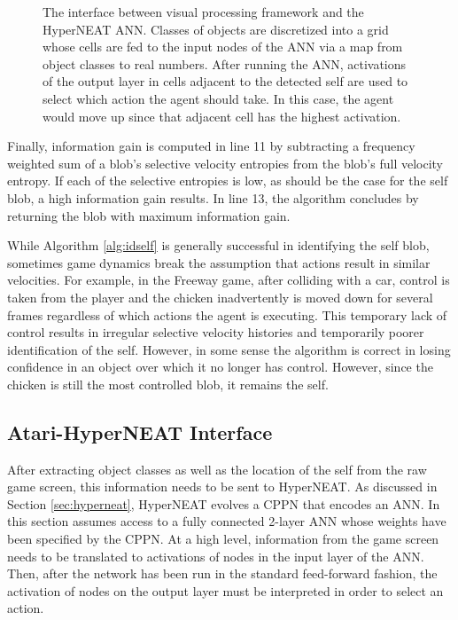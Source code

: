 \documentclass{acm_proc_article-sp}
\begin{document}
\begin{figure}
 \caption{The interface between visual processing framework and the HyperNEAT ANN. Classes of objects are discretized into a grid whose cells are fed to the input nodes of the ANN via a map from object classes to real numbers. After running the ANN, activations of the output layer in cells adjacent to the detected self are used to select which action the agent should take. In this case, the agent would move up since that adjacent cell has the highest activation.}
 \label{fig:interface}
\end{figure}

Finally, information gain is computed in line 11 by subtracting a frequency weighted sum of a blob's selective velocity entropies from the blob's full velocity entropy. If each of the selective entropies is low, as should be the case for the self blob, a high information gain results. In line 13, the algorithm concludes by returning the blob with maximum information gain.

While Algorithm \ref{alg:idself} is generally successful in identifying the self blob, sometimes game dynamics break the assumption that actions result in similar velocities. For example, in the Freeway game, after colliding with a car, control is taken from the player and the chicken inadvertently is moved down for several frames regardless of which actions the agent is executing. This temporary lack of control results in irregular selective velocity histories and temporarily poorer identification of the self. However, in some sense the algorithm is correct in losing confidence in an object over which it no longer has control. However, since the chicken is still the most controlled blob, it remains the self.

\subsection{Atari-HyperNEAT Interface}
\label{sec:interface}
After extracting object classes as well as the location of the self from the raw game screen, this information needs to be sent to HyperNEAT. As discussed in Section \ref{sec:hyperneat}, HyperNEAT evolves a CPPN that encodes an ANN. In this section assumes access to a fully connected 2-layer ANN whose weights have been specified by the CPPN. At a high level, information from the game screen needs to be translated to activations of nodes in the input layer of the ANN. Then, after the network has been run in the standard feed-forward fashion, the activation of nodes on the output layer must be interpreted in order to select an action.
\end{document}
